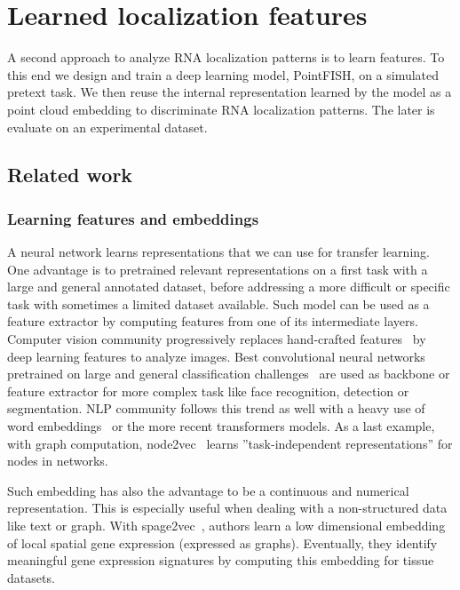 \section{Learned localization features}
\label{sec:learned_features}

A second approach to analyze \ac{RNA} localization patterns is to learn features.
To this end we design and train a deep learning model, PointFISH, on a simulated pretext task.
We then reuse the internal representation learned by the model as a point cloud embedding to discriminate \ac{RNA} localization patterns.
The later is evaluate on an experimental dataset.

\subsection{Related work}
\label{subsec:related_work_learned_features}

\subsubsection{Learning features and embeddings}

A neural network learns representations that we can use for transfer learning.
One advantage is to pretrained relevant representations on a first task with a large and general annotated dataset, before addressing a more difficult or specific task with sometimes a limited dataset available.
Such model can be used as a feature extractor by computing features from one of its intermediate layers.
Computer vision community progressively replaces hand-crafted features~\cite{Lowe_1999,Bay_2006} by deep learning features to analyze images.
Best convolutional neural networks pretrained on large and general classification challenges~\cite{He_2016_CVPR,Szegedy_2016_CVPR,Tan_2019,Huang_2017_CVPR} are used as backbone or feature extractor for more complex task like face recognition, detection or segmentation.
NLP community follows this trend as well with a heavy use of word embeddings~\cite{Mikolov_2013,Joulin_2016} or the more recent transformers models.
As a last example, with graph computation, node2vec~\cite{Grover_2016} learns ''task-independent representations'' for nodes in networks.

Such embedding has also the advantage to be a continuous and numerical representation.
This is especially useful when dealing with a non-structured data like text or graph.
With spage2vec~\cite{Partel_2021}, authors learn a low dimensional embedding of local spatial gene expression (expressed as graphs).
Eventually, they identify meaningful gene expression signatures by computing this embedding for tissue datasets.

